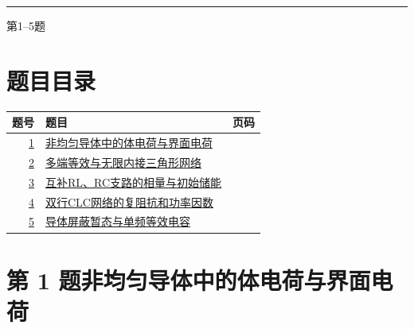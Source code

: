 \documentclass[UTF8,fontset=fandol,a4paper,11pt]{ctexart}
\begin{document}

\thispagestyle{empty}\vspace*{22mm}

\par\vspace{12mm}

\par\vspace{12mm}

\par\vspace{9mm}

\noindent\textcolor{accent}{\rule{\linewidth}{1pt}}\par\vspace{9mm}

\noindent 第1--5题\par\vfill\clearpage

\section*{题目目录}

\begin{longtable}{@{}r p{113mm} r@{}}\toprule 题号 & 题目 & 页码\\\midrule

\hyperref[q:1]{1} & \hyperref[q:1]{非均匀导体中的体电荷与界面电荷} & \pageref{q:1} \\

\hyperref[q:2]{2} & \hyperref[q:2]{多端等效与无限内接三角形网络} & \pageref{q:2} \\

\hyperref[q:3]{3} & \hyperref[q:3]{互补RL、RC支路的相量与初始储能} & \pageref{q:3} \\

\hyperref[q:4]{4} & \hyperref[q:4]{双行CLC网络的复阻抗和功率因数} & \pageref{q:4} \\

\hyperref[q:5]{5} & \hyperref[q:5]{导体屏蔽暂态与单频等效电容} & \pageref{q:5} \\

\bottomrule\end{longtable}

\clearpage


\section*{第 1 题\quad 非均匀导体中的体电荷与界面电荷}\label{q:1}
\end{document}
